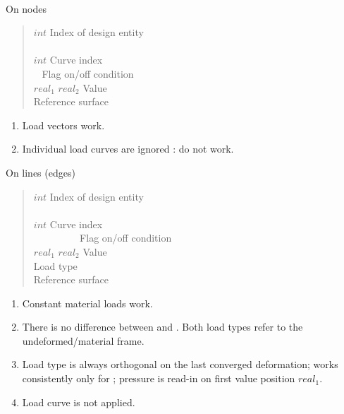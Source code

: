 \\
On nodes
\begin{quote}
 $int$ \cnl \chs Index of design entity\\
\cod{-} \cnl\\
\cgb {} \cor $int$ \cge \chs Curve index\\
\cgb {} \cor {} \cge \cgb {} \cor {} \cge\  \cnl \chs Flag on/off condition \\
$real_1$ $real_2$  \cnl \chs Value\\
 \chs Reference surface
\end{quote}
\begin{enumerate}
\item Load vectors work.
\item Individual load curves are ignored : do not work.
\end{enumerate}

On lines (edges)
\begin{quote}
 $int$ \cnl \chs Index of design entity\\
\cod{-} \cnl\\
\cgb {} \cor $int$ \cge \cnl \chs Curve index\\
\cgb\  \cor\  \cge\ \cgb\  \cor\  \cge\  \cnl \chs Flag on/off condition \\
$real_1$ $real_2$  \cnl \chs Value\\
\cgb {} \cor {} \cor {} \cge \cnl \chs Load type\\
 \chs Reference surface
\end{quote}
\begin{enumerate}
\item Constant material loads work.
\item There is no difference between  and . Both load types
refer to the undeformed/material frame.
\item
Load type  is always orthogonal on the last converged
deformation; works consistently only for ; pressure is read-in on
first value position $real_1$.
\item Load curve is not applied.
\end{enumerate}




